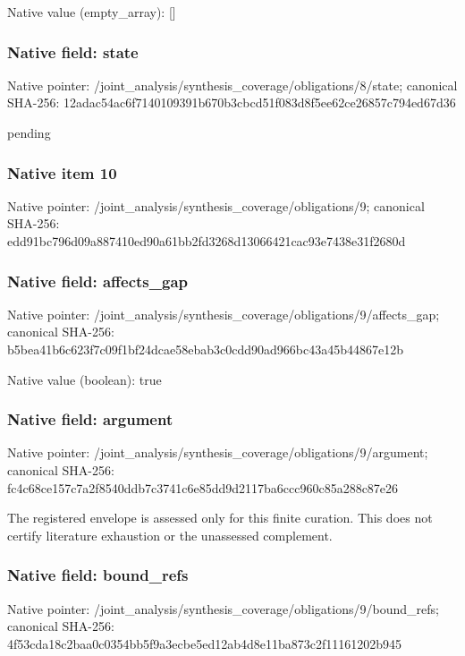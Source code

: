 \documentclass[10pt,a4paper]{article}
\begin{document}
Native value (empty\_\allowbreak{}array): []

\subsubsection{Native field: state}
Native pointer: /joint\_\allowbreak{}analysis/synthesis\_\allowbreak{}coverage/obligations/8/state; canonical SHA-256: 12adac54ac6f7140109391b670b3cbcd51f083d8f5ee62ce26857c794ed67d36

\begingroup\raggedright\sloppy pending\par\endgroup

\subsubsection{Native item 10}
Native pointer: /joint\_\allowbreak{}analysis/synthesis\_\allowbreak{}coverage/obligations/9; canonical SHA-256: edd91bc796d09a887410ed90a61bb2fd3268d13066421cac93e7438e31f2680d

\subsubsection{Native field: affects\_\allowbreak{}gap}
Native pointer: /joint\_\allowbreak{}analysis/synthesis\_\allowbreak{}coverage/obligations/9/affects\_\allowbreak{}gap; canonical SHA-256: b5bea41b6c623f7c09f1bf24dcae58ebab3c0cdd90ad966bc43a45b44867e12b

Native value (boolean): true

\subsubsection{Native field: argument}
Native pointer: /joint\_\allowbreak{}analysis/synthesis\_\allowbreak{}coverage/obligations/9/argument; canonical SHA-256: fc4c68ce157c7a2f8540ddb7c3741c6e85dd9d2117ba6ccc960c85a288c87e26

\begingroup\raggedright\sloppy The registered envelope is assessed only for this finite curation. This does not certify literature exhaustion or the unassessed complement.\par\endgroup

\subsubsection{Native field: bound\_\allowbreak{}refs}
Native pointer: /joint\_\allowbreak{}analysis/synthesis\_\allowbreak{}coverage/obligations/9/bound\_\allowbreak{}refs; canonical SHA-256: 4f53cda18c2baa0c0354bb5f9a3ecbe5ed12ab4d8e11ba873c2f11161202b945
\end{document}

